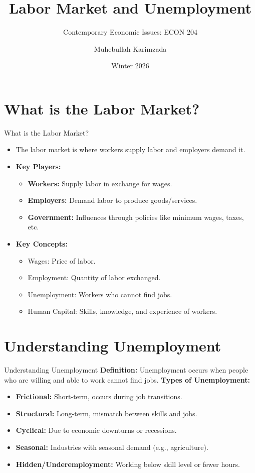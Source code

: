 \documentclass{beamer}
\title[Labor Market and Unemployment]{Labor Market and Unemployment}
\subtitle{Contemporary Economic Issues: ECON 204}
\author{Muhebullah Karimzada}
\date{Winter 2026}
\begin{document}
\begin{frame}
    \titlepage
\end{frame}



\section{What is the Labor Market?}
\begin{frame}{What is the Labor Market?}
    \begin{itemize}
        \item The labor market is where workers supply labor and employers demand it.
        \item \textbf{Key Players:}
        \begin{itemize}
            \item \textbf{Workers:} Supply labor in exchange for wages.
            \item \textbf{Employers:} Demand labor to produce goods/services.
            \item \textbf{Government:} Influences through policies like minimum wages, taxes, etc.
        \end{itemize}
        \item \textbf{Key Concepts:}
        \begin{itemize}
            \item Wages: Price of labor.
            \item Employment: Quantity of labor exchanged.
            \item Unemployment: Workers who cannot find jobs.
            \item Human Capital: Skills, knowledge, and experience of workers.
        \end{itemize}
    \end{itemize}
\end{frame}

\section{Understanding Unemployment}
\begin{frame}{Understanding Unemployment}
    \textbf{Definition:} Unemployment occurs when people who are willing and able to work cannot find jobs.
    \vspace{0.5cm}
    \textbf{Types of Unemployment:}
    \begin{itemize}
        \item \textbf{Frictional:} Short-term, occurs during job transitions.
        \item \textbf{Structural:} Long-term, mismatch between skills and jobs.
        \item \textbf{Cyclical:} Due to economic downturns or recessions.
        \item \textbf{Seasonal:} Industries with seasonal demand (e.g., agriculture).
        \item \textbf{Hidden/Underemployment:} Working below skill level or fewer hours.
    \end{itemize}
\end{frame}
\end{document}
